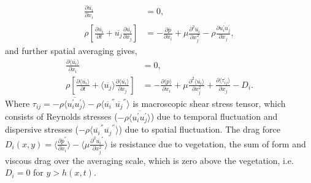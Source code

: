 \documentclass[12pt]{report}   %
\renewcommand{\bar}{\overline}
\begin{document}
 \begin{equation}
 \begin{split}
 \frac{\partial \bar{u_i} }{\partial x_i} &=0, \\
 \rho \left[ \frac{\partial  \overline{u_i}  }{\partial t}+  \overline{u_j}  \frac{\partial  \overline{u_i} }{\partial x_j} \right ] &= -\frac{\partial  \bar{p}   }{\partial x_i} + \mu \frac{\partial^2  \overline{u_i}  }{\partial x_j^2} - \rho \frac{\partial  \overline { u_i^{'} u_j^{'} }  }{\partial x_j}, 
 \end{split}
 \end{equation}
 and further spatial averaging gives,
  \begin{equation}\label{averaged_eq}
  \begin{split}
  \frac{\partial \langle \bar{u_i} \rangle}{\partial x_i}&=0, \\
 \rho \left[ \frac{\partial \langle \overline{u_i} \rangle }{\partial t}+ \langle \overline{u_j} \rangle \frac{\partial \langle \bar{u_i} \rangle}{\partial x_j} \right ] &= -\frac{\partial \langle \bar{p} \rangle  }{\partial x_i} + \mu \frac{\partial^2 \langle \bar{u_i} \rangle }{\partial         x_j^2} + \frac{\partial \langle \bar{\tau_{ij}} \rangle }{\partial x_j} -D_i.
 \end{split}
 \end{equation}
 Where $\tau_{ij}=-\rho \langle \overline{u_i^{'} u_j^{'}} \rangle  -\rho \langle{ \overline{u_i}^{''} \overline{u_j}^{''} } \rangle  $ is macroscopic shear stress tensor, which consists of Reynolds stresses ($ -\rho \langle \overline {u_i^{'} u_j^{'}} \rangle $) due to temporal fluctuation and dispersive stresses ($ -\rho \langle{ \overline{u_i}^{''} \overline{u_j}^{''} } \rangle $) due to spatial fluctuation. The drag force $D_i(x,y) = \langle \frac{\partial \overline{p}^{''}}{\partial x_i} \rangle - \langle \mu \frac{\partial^2 \bar{u_i}^{''} }{\partial x_j^2} \rangle $ is resistance due to vegetation, the sum of form and viscous drag over the averaging scale, which is zero above the vegetation, i.e. $D_i = 0 $ for $y>h(x,t)$. 
 
\end{document}
